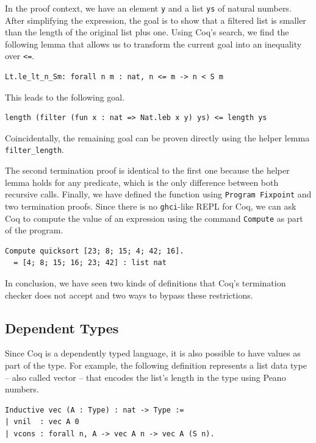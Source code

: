 \documentclass[a4paper, 11pt, fleqn, twoside]{scrreprt}
\newcommand{\hinl}[1]{\texttt{#1}}
\newcommand{\cinl}[1]{\texttt{#1}}
\begin{document}
In the proof context, we have an element \cinl{y} and a list \cinl{ys} of natural numbers.
After simplifying the expression, the goal is to show that a filtered list is smaller than the length of the original list plus one.
Using Coq's search, we find the following lemma that allows us to transform the current goal into an inequality over \cinl{<=}.

\begin{verbatim}
Lt.le_lt_n_Sm: forall n m : nat, n <= m -> n < S m
\end{verbatim}

This leads to the following goal.

\begin{verbatim}
length (filter (fun x : nat => Nat.leb x y) ys) <= length ys
\end{verbatim}

Coincidentally, the remaining goal can be proven directly using the helper lemma \cinl{filter_length}.

The second termination proof is identical to the first one because the helper lemma holds for any predicate, which is the only difference between both recursive calls.
Finally, we have defined the function using \cinl{Program Fixpoint} and two termination proofs.
Since there is no \hinl{ghci}-like REPL for Coq, we can ask Coq to compute the value of an expression using the command \cinl{Compute} as part of the program.

\begin{verbatim}
Compute quicksort [23; 8; 15; 4; 42; 16].
  = [4; 8; 15; 16; 23; 42] : list nat
\end{verbatim}

In conclusion, we have seen two kinds of definitions that Coq's termination checker does not accept and two ways to bypass these restrictions.

\subsection{Dependent Types}
\label{subsec:dependent}

Since Coq is a dependently typed language, it is also possible to have values as part of the type.
For example, the following definition represents a list data type -- also called vector -- that encodes the list's length in the type using Peano numbers.

\begin{verbatim}
Inductive vec (A : Type) : nat -> Type :=
| vnil  : vec A 0
| vcons : forall n, A -> vec A n -> vec A (S n).
\end{verbatim}
\end{document}
